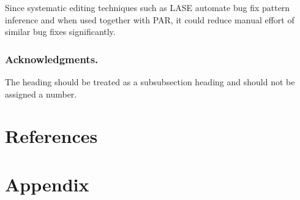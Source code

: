 \documentclass[runningheads,a4paper]{llncs}
\begin{document}
 
Since systematic editing techniques such as LASE automate bug fix pattern inference and when used together with PAR, it could reduce manual effort of similar bug fixes significantly. 
\subsubsection*{Acknowledgments.} The heading should be treated as a
subsubsection heading and should not be assigned a number.

\section{References}\label{references}
%



\section*{Appendix} 
\end{document}
